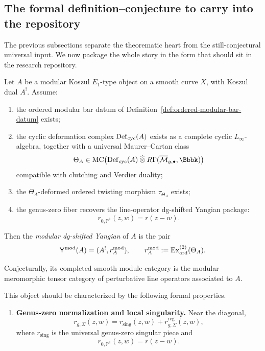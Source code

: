 \subsection{The formal definition--conjecture to carry into the repository}

The previous subsections separate the theorematic heart from the still-conjectural universal input.
We now package the whole story in the form that should sit in the research repository.

\begin{definition}
\label{defconj:modular-dg-shifted-yangian}
Let $A$ be a modular Koszul $E_1$-type object on a smooth curve $X$, with Koszul dual $A^!$.
Assume:

\begin{enumerate}
\item[(H1)]
the ordered modular bar datum of Definition~\ref{def:ordered-modular-bar-datum} exists;

\item[(H2)]
the cyclic deformation complex $\operatorname{Def}_{\mathrm{cyc}}(A)$ exists as a complete cyclic $L_\infty$-algebra,
together with a universal Maurer--Cartan class
\[
\Theta_A\in
\MC\!\left(\Def_{\mathrm{cyc}}(A)\bigtensor R\Gamma(\overline{\mathcal M}_{g,\bullet},\Bbbk)\right)
\]
compatible with clutching and Verdier duality;

\item[(H3)]
the $\Theta_A$-deformed ordered twisting morphism $\tau_{\Theta_A}$ exists;

\item[(H4)]
the genus-zero fiber recovers the line-operator dg-shifted Yangian package:
\[
r_{0,\mathbb{P}^1}(z,w)=r(z-w).
\]
\end{enumerate}

Then the \emph{modular dg-shifted Yangian} of $A$ is the pair
\[
\mathsf Y^{\mathrm{mod}}(A)
=
(A^!,r_A^{\mathrm{mod}}),
\qquad
r_A^{\mathrm{mod}}:=\mathrm{Ex}_{\mathrm{ord}}^{(2)}(\Theta_A).
\]

Conjecturally, its completed smooth module category is the modular meromorphic tensor category of
perturbative line operators associated to $A$.

This object should be characterized by the following formal properties.

\begin{enumerate}
\item[(P1)]
\textbf{Genus-zero normalization and local singularity.}
Near the diagonal,
\[
r_{g,\Sigma}(z,w)=r_{\mathrm{sing}}(z,w)+r^{\mathrm{reg}}_{g,\Sigma}(z,w),
\]
where $r_{\mathrm{sing}}$ is the universal genus-zero singular piece and
\[
r_{0,\mathbb{P}^1}(z,w)=r(z-w).
\]


\end{enumerate}
\end{definition}
